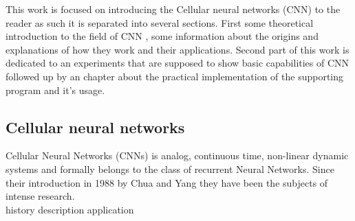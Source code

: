 This work is focused on introducing the Cellular neural networks (CNN) to the reader as such it is separated into several sections. First some theoretical introduction to the field of CNN , some information about the origins and explanations of how they work and their applications. Second part of this work is dedicated to an experiments that are supposed to show basic capabilities of CNN followed up by an chapter about the practical implementation of the supporting program and it's usage. 


\subsection{Cellular neural networks}
Cellular Neural Networks (CNNs) is analog, continuous time, non-linear dynamic
systems and formally belongs to the class of recurrent Neural Networks. Since
their introduction in 1988 by Chua and Yang \cite{Chua-Yang} they have been the subjects of
intense research. \\
history
description
application